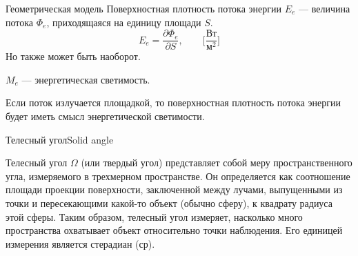 \documentclass{beamer}
\begin{document}
	\begin{frame}{Геометрическая модель}
		Поверхностная плотность потока энергии $E_e$ --- величина потока $\Phi_e$, приходящаяся на единицу площади $S$.
		\[
			E_e = \frac{\partial \Phi_e}{\partial S}, \qquad \bigg[ \frac{\text{Вт}}{\text{м}^2} \bigg]
		\]
		Но также может быть наоборот.
		
		$M_e$ --- энергетическая светимость.

		Если поток излучается площадкой, то поверхностная плотность потока энергии будет иметь смысл энергетической светимости.

		\note{

			\[
				\int E_e d S = \Phi_e
			\]
			\[
				\int \int E_e d x d y = \Phi_e
			\]
		}
	\end{frame}



	\begin{frame}{Телесный угол}{Solid angle}

		Телесный угол $\Omega$ (или твердый угол) представляет собой меру пространственного угла, измеряемого в трехмерном пространстве. Он определяется как соотношение площади проекции поверхности, заключенной между лучами, выпущенными из точки и пересекающими какой-то объект (обычно сферу), к квадрату радиуса этой сферы. Таким образом, телесный угол измеряет, насколько много пространства охватывает объект относительно точки наблюдения. Его единицей измерения является стерадиан (ср).

	\end{frame}
\end{document}
